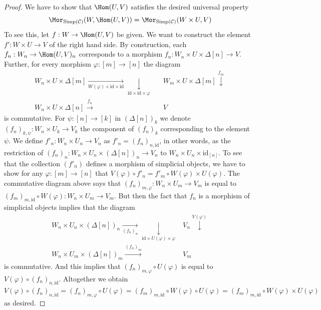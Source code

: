\begin{proof}
\medskip\noindent
We have to show that $\Hom(U, V)$ satisfies the desired
universal property
$$
\Mor_{\text{Simp}(\mathcal{C})}(W, \Hom(U, V))
=
\Mor_{\text{Simp}(\mathcal{C})}(W \times U, V)
$$
To see this, let $f : W \to \Hom(U, V)$ be given.
We want to construct the element $f' : W \times U \to V$
of the right hand side.
By construction, each $f_n : W_n \to \Hom(U, V)_n$
corresponds to a morphism
$f_n : W_n \times U \times \Delta[n] \to V$. Further,
for every morphism $\varphi : [m] \to [n]$ the
diagram
$$
\begin{array}{ccc}W_n \times U \times \Delta[m]
\underset{W(\varphi)\times \text{id} \times \text{id}}{\longrightarrow}\underset{\text{id} \times \text{id} \times \varphi}{\downarrow} &  & W_m \times U \times \Delta[m] \overset{f_m}{\downarrow} \\ W_n \times U \times \Delta[n] \overset{f_n}{\longrightarrow} &  & V\end{array}
$$
is commutative. For $\psi : [n] \to [k]$ in $(\Delta[n])_k$
we denote $(f_n)_{k, \psi} : W_n \times U_k \to V_k$
the component of $(f_n)_k$ corresponding to the element
$\psi$. We define $f'_n : W_n \times U_n \to V_n$
as $f'_n = (f_n)_{n, \text{id}}$, in other words, as
the restriction of
$(f_n)_n : W_n \times U_n \times (\Delta[n])_n \to V_n$
to $W_n \times U_n \times \text{id}_{[n]}$.
To see that the collection $(f'_n)$ defines a
morphism of simplicial objects, we have to show
for any $\varphi : [m] \to [n]$ that
$V(\varphi) \circ f'_n =
f'_m \circ W(\varphi) \times U(\varphi)$.
The commutative diagram above says that
$(f_n)_{m, \varphi} : W_n \times U_m \to V_m$
is equal to
$(f_m)_{m, \text{id}} \circ W(\varphi) :
W_n \times U_m \to V_m$.
But then the fact that $f_n$ is a morphism of simplicial
objects implies that the diagram
$$
\begin{array}{cc}W_n \times U_n \times (\Delta[n])_n
\underset{(f_n)_n}{\longrightarrow}\underset{\text{id} \times U(\varphi) \times \varphi}{\downarrow} & V_n \overset{V(\varphi)}{\downarrow} \\ W_n \times U_m \times (\Delta[n])_m \overset{(f_n)_m}{\longrightarrow} & V_m\end{array}
$$
is commutative. And this implies that
$(f_n)_{m, \varphi} \circ U(\varphi)$ is
equal to $V(\varphi) \circ (f_n)_{n, \text{id}}$.
Altogether we obtain
$
V(\varphi) \circ (f_n)_{n, \text{id}}
=
(f_n)_{m, \varphi} \circ U(\varphi)
=
(f_m)_{m, \text{id}} \circ W(\varphi)\circ U(\varphi)
=
(f_m)_{m, \text{id}} \circ W(\varphi)\times U(\varphi)
$
as desired.


\end{proof}
